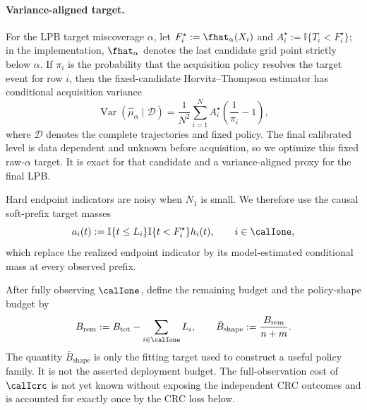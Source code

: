 \paragraph{Variance-aligned target.}
For the LPB target miscoverage $\alpha$, let
$F_i^\star:=\fhat_\alpha(X_i)$ and
$A_i^\star:=\mathbb I\{T_i<F_i^\star\}$; in the implementation,
$\fhat_\alpha$ denotes the last candidate grid point strictly below $\alpha$.
If $\pi_i$ is the probability that the acquisition policy resolves the
target event for row $i$, then the fixed-candidate Horvitz--Thompson estimator
has conditional acquisition variance
\begin{equation}
    \operatorname{Var}(\widehat\mu_\alpha\mid\mathcal D)
    =\frac{1}{N^2}\sum_{i=1}^{N}
      A_i^\star\left(\frac{1}{\pi_i}-1\right),
    \label{eq:dapro_main_ht_variance}
\end{equation}
where $\mathcal D$ denotes the complete trajectories and fixed policy.  The
final calibrated level is data dependent and unknown before acquisition, so
we optimize this fixed raw-$\alpha$ target.  It is exact for that candidate
and a variance-aligned proxy for the final LPB.

Hard endpoint indicators are noisy when $N_1$ is small.  We therefore use the
causal soft-prefix target masses
\begin{equation}
    a_i(t):=
      \mathbb I\{t\leq L_i\}
      \mathbb I\{t<F_i^\star\}h_i(t),
      \qquad i\in\calIone,
    \label{eq:dapro_main_soft_mass}
\end{equation}
which replace the realized endpoint indicator by its model-estimated
conditional mass at every observed prefix.

After fully observing $\calIone$, define the remaining budget and the
policy-shape budget by
\begin{equation}
    B_{\mathrm{rem}}
      :=B_{\mathrm{tot}}-\sum_{i\in\calIone}L_i,
    \qquad
    \bar B_{\mathrm{shape}}
      :=\frac{B_{\mathrm{rem}}}{n+m}.
    \label{eq:dapro_main_shape_budget}
\end{equation}
The quantity $\bar B_{\mathrm{shape}}$ is only the fitting target used to
construct a useful policy family.  It is not the asserted deployment budget.
The full-observation cost of $\calIcrc$ is not yet known without exposing the
independent CRC outcomes and is accounted for exactly once by the CRC loss
below.

